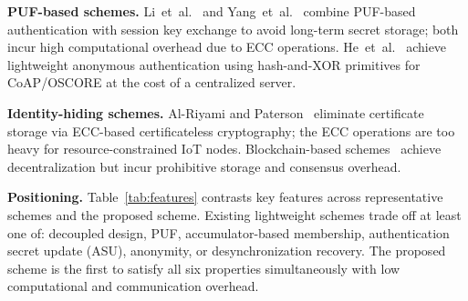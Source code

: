 \documentclass[conference]{IEEEtran}
\begin{document}
\textbf{PUF-based schemes.}
Li~et~al.~\cite{li2020puf} and Yang~et~al.~\cite{yang2024sakms} combine
PUF-based authentication with session key exchange to avoid long-term secret
storage; both incur high computational overhead due to ECC operations.
He~et~al.~\cite{he2023lightweight} achieve lightweight anonymous
authentication using hash-and-XOR primitives for CoAP/OSCORE at the cost of
a centralized server.

\textbf{Identity-hiding schemes.}
Al-Riyami and Paterson~\cite{alriyami2003cert} eliminate certificate storage
via ECC-based certificateless cryptography; the ECC operations are too heavy
for resource-constrained IoT nodes.
Blockchain-based schemes~\cite{zhang2023blockchain,ahmed2023chains,sikarwar2020eff}
achieve decentralization but incur prohibitive storage and consensus overhead.

\textbf{Positioning.}
Table~\ref{tab:features} contrasts key features across representative schemes
and the proposed scheme.  Existing lightweight schemes trade off at least one
of: decoupled design, PUF, accumulator-based membership, authentication
secret update (ASU), anonymity, or desynchronization recovery.  The proposed
scheme is the first to satisfy all six properties simultaneously with low
computational and communication overhead.
\end{document}

